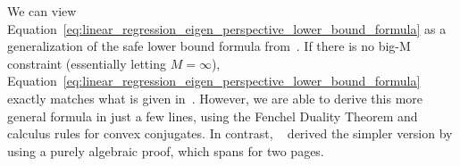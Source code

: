 We can view Equation~\eqref{eq:linear_regression_eigen_perspective_lower_bound_formula} as a generalization of the safe lower bound formula from~\cite{liu2024okridge}.
If there is no big-M constraint (essentially letting $M = \infty$), Equation~\eqref{eq:linear_regression_eigen_perspective_lower_bound_formula} exactly matches what is given in~\cite{liu2024okridge}.
However, we are able to derive this more general formula in just a few lines, using the Fenchel Duality Theorem and calculus rules for convex conjugates.
In contrast, ~\cite{liu2024okridge} derived the simpler version by using a purely algebraic proof, which spans for two pages.
